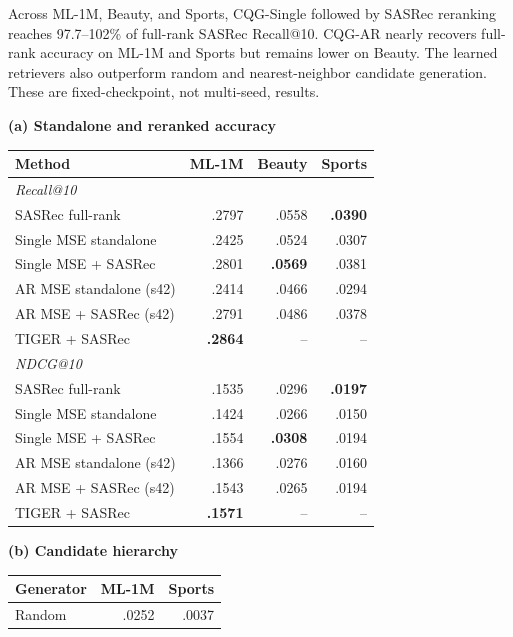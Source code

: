 \documentclass[letterpaper]{article}
\begin{document}
Across ML-1M, Beauty, and Sports, CQG-Single followed by SASRec reranking
reaches 97.7--102\% of full-rank SASRec Recall@10. CQG-AR nearly recovers
full-rank accuracy on ML-1M and Sports but remains lower on Beauty. The
learned retrievers also outperform random and nearest-neighbor candidate
generation. These are fixed-checkpoint, not multi-seed, results.

\begin{table}[H]
\centering
\small
\begin{minipage}[t]{0.625\textwidth}
\centering
\textbf{(a) Standalone and reranked accuracy}\\[2pt]
\setlength{\tabcolsep}{2.2pt}
\begin{tabular}{lrrr}
\toprule
Method & ML-1M & Beauty & Sports \\
\midrule
\multicolumn{4}{l}{\textit{Recall@10}} \\
SASRec full-rank & .2797 & .0558 & \textbf{.0390} \\
Single MSE standalone & .2425 & .0524 & .0307 \\
Single MSE + SASRec & .2801 & \textbf{.0569} & .0381 \\
AR MSE standalone (s42) & .2414 & .0466 & .0294 \\
AR MSE + SASRec (s42) & .2791 & .0486 & .0378 \\
TIGER + SASRec & \textbf{.2864} & -- & -- \\
\midrule
\multicolumn{4}{l}{\textit{NDCG@10}} \\
SASRec full-rank & .1535 & .0296 & \textbf{.0197} \\
Single MSE standalone & .1424 & .0266 & .0150 \\
Single MSE + SASRec & .1554 & \textbf{.0308} & .0194 \\
AR MSE standalone (s42) & .1366 & .0276 & .0160 \\
AR MSE + SASRec (s42) & .1543 & .0265 & .0194 \\
TIGER + SASRec & \textbf{.1571} & -- & -- \\
\bottomrule
\end{tabular}
\end{minipage}\hfill
\begin{minipage}[t]{0.36\textwidth}
\centering
\textbf{(b) Candidate hierarchy}\\[2pt]
\setlength{\tabcolsep}{2.2pt}
\begin{tabular}{lrr}
\toprule
Generator & ML-1M & Sports \\
\midrule
Random & .0252 & .0037 \\

\end{tabular}
\end{minipage}
\end{table}
\end{document}
